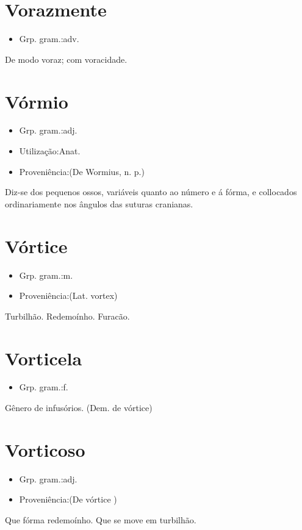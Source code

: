 \documentclass{article}
\begin{document}
\section{Vorazmente}
\begin{itemize}
\item {Grp. gram.:adv.}
\end{itemize}
De modo voraz; com voracidade.
\section{Vórmio}
\begin{itemize}
\item {Grp. gram.:adj.}
\end{itemize}
\begin{itemize}
\item {Utilização:Anat.}
\end{itemize}
\begin{itemize}
\item {Proveniência:(De \textunderscore Wormius\textunderscore , n. p.)}
\end{itemize}
Diz-se dos pequenos ossos, variáveis quanto ao número e á fórma, e collocados ordinariamente nos ângulos das suturas cranianas.
\section{Vórtice}
\begin{itemize}
\item {Grp. gram.:m.}
\end{itemize}
\begin{itemize}
\item {Proveniência:(Lat. \textunderscore vortex\textunderscore )}
\end{itemize}
Turbilhão.
Redemoínho.
Furacão.
\section{Vorticela}
\begin{itemize}
\item {Grp. gram.:f.}
\end{itemize}
Gênero de infusórios.
(Dem. de \textunderscore vórtice\textunderscore )
\section{Vorticoso}
\begin{itemize}
\item {Grp. gram.:adj.}
\end{itemize}
\begin{itemize}
\item {Proveniência:(De \textunderscore vórtice \textunderscore )}
\end{itemize}
Que fórma redemoínho.
Que se move em turbilhão.
\end{document}
